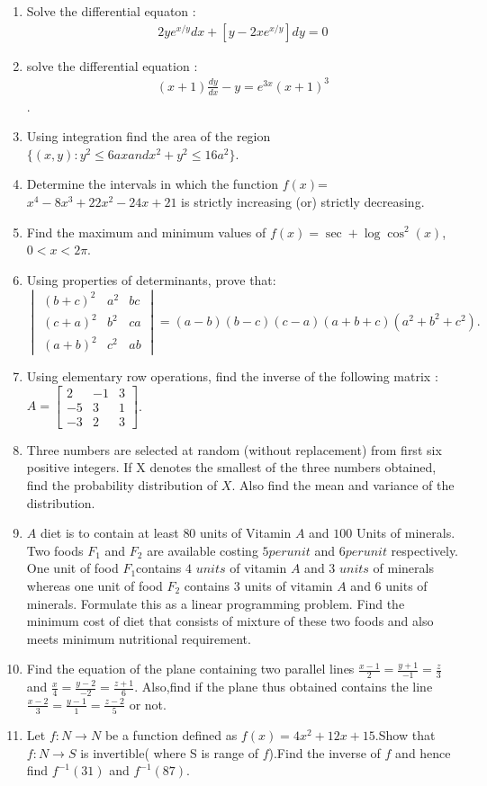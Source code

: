 \documentclass[12pt,-letter paper]{article}
\providecommand{\mydet}[1]{\ensuremath{\begin{vmatrix}#1\end{vmatrix}}}
\providecommand{\myvec}[1]{\ensuremath{\begin{bmatrix}#1\end{bmatrix}}}
\begin{document}
\begin{enumerate}
\item Solve the differential equaton : \begin{align*}2ye^{x/y}dx+[y-2xe^{x/y}]dy=0\end{align*}
	\item solve the differential equation : \begin{align*}(x+1)\frac{dy}{dx}-y=e^{3x}(x+1)^3\end{align*}.
\item Using integration find the area of the region $\{(x,y):y^2 \leq 6 ax and x^2+y^2 \leq 16a^2\}$.	
\item Determine the intervals in which the function $f(x)$=$x^4-8x^3+22x^2-24x+21$ is strictly increasing (or) strictly decreasing.
\item Find the maximum and minimum values of $f(x) =\sec+\log\cos^2(x)$,$0<x<2\pi$.
\item Using properties of determinants, prove that: 
$\mydet{ 
(b+c)^2 & a^2 & bc \\ 
(c+a)^2 & b^2 & ca \\ 
(a+b)^2 & c^2 & ab } = (a-b)(b-c)(c-a)(a+b+c)(a^2+b^2+c^2).
$
\item Using elementary row operations, find the inverse of the following matrix : $A= \myvec{2&-1&3\\-5&3&1\\-3&2&3}$.
\item Three numbers are selected at random (without replacement) from first six positive integers. If X denotes the smallest of the three numbers obtained, find the probability distribution of $X$. Also find the mean and variance of the distribution.
\item $A$ diet is to contain at least $80$ units of Vitamin $A$ and $100$ Units of minerals. Two foods $F_1$ and $F_2$ are available costing \rupee$5 per unit$ and \rupee$6 per unit$ respectively. One unit of food $F_1$contains $4$ $units$ of vitamin $A$ and $3$ $units$ of minerals whereas one unit of food $F_2$ contains $3$ units of vitamin $A$ and $6$ units of minerals. Formulate this as a linear programming problem. Find the minimum cost of diet that consists of mixture of these two foods and also meets minimum nutritional requirement.
\item  Find the equation of the plane containing two parallel lines  $\frac{x-1}{2}=\frac{y+1}{-1}=\frac{z}{3}$ and $\frac{x}{4}=\frac{y-2}{-2}=\frac{z+1}{6}.$ Also,find if the plane thus obtained contains  the line $\frac{x-2}{3}=\frac{y-1}{1}=\frac{z-2}{5}$ or not.
\item Let $f : N \rightarrow N$ be a function defined as $f(x)= 4x^{2}+12x+15$.Show that $f:N \rightarrow S$ is invertible( where S is range of $f$).Find the inverse of $f$ and hence find $f^{-1}(31)$ and $f^{-1}(87)$.
\end{enumerate}
\end{document}
